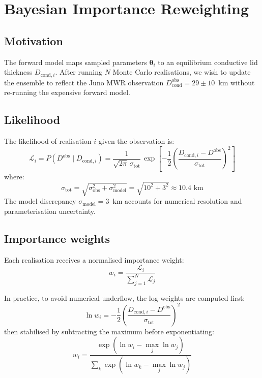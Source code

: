 \documentclass[11pt,a4paper]{article}
\begin{document}
\section{Bayesian Importance Reweighting}
\label{sec:bayes}

\subsection{Motivation}

The forward model maps sampled parameters $\boldsymbol{\theta}_i$ to an
equilibrium conductive lid thickness $D_{\mathrm{cond},i}$. After
running $N$ Monte Carlo realisations, we wish to update the ensemble
to reflect the Juno MWR observation
$D_{\mathrm{cond}}^{\mathrm{obs}} = 29 \pm 10$~km without re-running
the expensive forward model.

\subsection{Likelihood}

The likelihood of realisation $i$ given the observation is:
\begin{equation}
\mathcal{L}_i = P(D^{\mathrm{obs}} \mid D_{\mathrm{cond},i})
  = \frac{1}{\sqrt{2\pi}\,\sigma_{\mathrm{tot}}}\,
  \exp\!\left[-\frac{1}{2}
  \left(\frac{D_{\mathrm{cond},i} - D^{\mathrm{obs}}}
    {\sigma_{\mathrm{tot}}}\right)^{\!2}\right]
\end{equation}
where:
\begin{equation}
\sigma_{\mathrm{tot}} = \sqrt{\sigma_{\mathrm{obs}}^2 + \sigma_{\mathrm{model}}^2}
  = \sqrt{10^2 + 3^2} \approx 10.4\text{~km}
\end{equation}
The model discrepancy $\sigma_{\mathrm{model}} = 3$~km accounts for
numerical resolution and parameterisation uncertainty.

\subsection{Importance weights}

Each realisation receives a normalised importance weight:
\begin{equation}
w_i = \frac{\mathcal{L}_i}{\sum_{j=1}^N \mathcal{L}_j}
\end{equation}

In practice, to avoid numerical underflow, the log-weights are computed
first:
\begin{equation}
\ln w_i = -\frac{1}{2}\left(\frac{D_{\mathrm{cond},i} - D^{\mathrm{obs}}}
  {\sigma_{\mathrm{tot}}}\right)^{\!2}
\end{equation}
then stabilised by subtracting the maximum before exponentiating:
\begin{equation}
w_i = \frac{\exp(\ln w_i - \max_j \ln w_j)}
  {\sum_k \exp(\ln w_k - \max_j \ln w_j)}
\end{equation}
\end{document}
